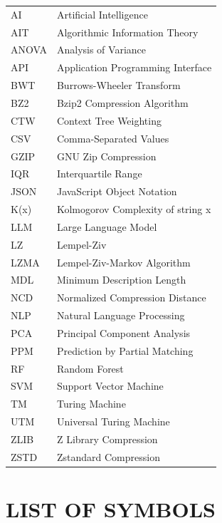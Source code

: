 \documentclass[12pt,a4paper]{report}
\begin{document}
\begin{tabular}{ll}
AI & Artificial Intelligence\\
AIT & Algorithmic Information Theory\\
ANOVA & Analysis of Variance\\
API & Application Programming Interface\\
BWT & Burrows-Wheeler Transform\\
BZ2 & Bzip2 Compression Algorithm\\
CTW & Context Tree Weighting\\
CSV & Comma-Separated Values\\
GZIP & GNU Zip Compression\\
IQR & Interquartile Range\\
JSON & JavaScript Object Notation\\
K(x) & Kolmogorov Complexity of string x\\
LLM & Large Language Model\\
LZ & Lempel-Ziv\\
LZMA & Lempel-Ziv-Markov Algorithm\\
MDL & Minimum Description Length\\
NCD & Normalized Compression Distance\\
NLP & Natural Language Processing\\
PCA & Principal Component Analysis\\
PPM & Prediction by Partial Matching\\
RF & Random Forest\\
SVM & Support Vector Machine\\
TM & Turing Machine\\
UTM & Universal Turing Machine\\
ZLIB & Z Library Compression\\
ZSTD & Zstandard Compression\\
\end{tabular}

\chapter*{LIST OF SYMBOLS}
\end{document}
